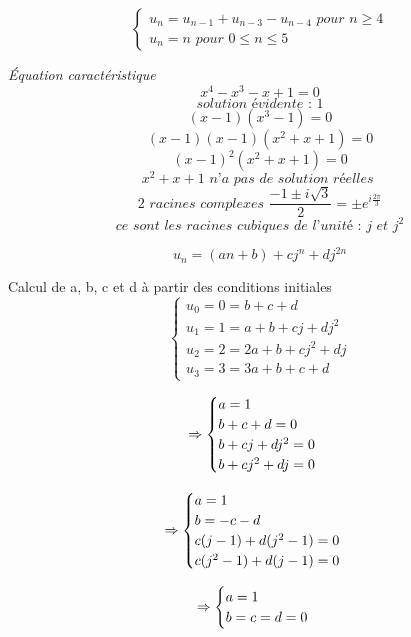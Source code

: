 \begin{exercice}
\[ \begin{cases} u_n=u_{n-1}+u_{n-3}-u_{n-4} \textit{ pour } n\ge 4 \\ u_n=n \textit{ pour } 0 \le n \le 5 \end{cases} \]

\textit{Équation caractéristique} 
\[ x^4-x^3-x+1=0 \]
\[ \textit{solution évidente : } 1 \]
\[ (x-1)(x^3-1)=0 \]
\[ (x-1)(x-1)(x^2+x+1)=0 \]
\[ (x-1)^2(x^2+x+1)=0 \]
\[ x^2+x+1 \textit{ n'a pas de solution réelles } \]
\[ 2 \textit{ racines complexes } \frac{-1 \pm 
i \sqrt{3}}{2} = \pm e^{i\frac{2\pi}{3}} \]
\[ \textit{ce sont les racines cubiques de l'unité : } j \textit{ et } j^2 \]

\[ u_n=(an+b)+cj^n+dj^{2n} \]

Calcul de a, b, c et d à partir des conditions initiales
\[ \begin{cases} u_0=0=b+c+d \\ 
u_1=1=a+b+cj+dj^2 \\
u_2=2=2a+b+cj^2+dj \\
u_3=3=3a+b+c+d \end{cases} \]

\[ \Rightarrow \begin{cases} a=1 \\ 
b+c+d=0 \\
b+cj+dj^2=0 \\
b+cj^2+dj=0 \end{cases} \]

\[ \Rightarrow \begin{cases} a=1 \\ 
b=-c-d \\
c(j-1)+d(j^2-1)=0 \\
c(j^2-1)+d(j-1)=0 \end{cases} \]

\[ \Rightarrow \begin{cases} a=1 \\ 
b=c=d=0 \end{cases} \]
 
\end{exercice}
 
